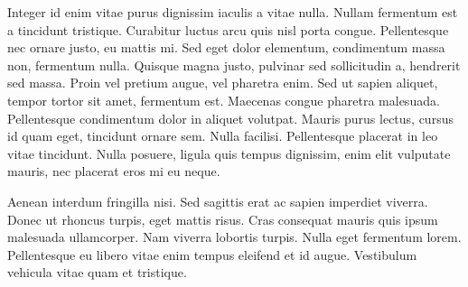 \documentclass[twoside]{article}
\begin{document}
Integer id enim vitae purus dignissim iaculis a vitae nulla. Nullam fermentum est a tincidunt tristique. Curabitur luctus arcu quis nisl porta congue. Pellentesque nec ornare justo, eu mattis mi. Sed eget dolor elementum, condimentum massa non, fermentum nulla. Quisque magna justo, pulvinar sed sollicitudin a, hendrerit sed massa. Proin vel pretium augue, vel pharetra enim. Sed ut sapien aliquet, tempor tortor sit amet, fermentum est. Maecenas congue pharetra malesuada. Pellentesque condimentum dolor in aliquet volutpat. Mauris purus lectus, cursus id quam eget, tincidunt ornare sem. Nulla facilisi. Pellentesque placerat in leo vitae tincidunt. Nulla posuere, ligula quis tempus dignissim, enim elit vulputate mauris, nec placerat eros mi eu neque.

Aenean interdum fringilla nisi. Sed sagittis erat ac sapien imperdiet viverra. Donec ut rhoncus turpis, eget mattis risus. Cras consequat mauris quis ipsum malesuada ullamcorper. Nam viverra lobortis turpis. Nulla eget fermentum lorem. Pellentesque eu libero vitae enim tempus eleifend et id augue. Vestibulum vehicula vitae quam et tristique.

\endnumbering
\end{document}
